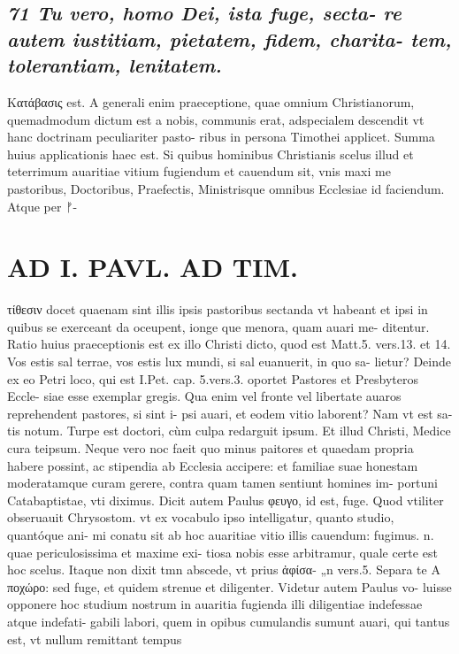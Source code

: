 \documentclass{article}
\begin{document}
\begin{pages}
\subsection*{\textit{71 Tu vero, homo Dei, ista fuge, secta- re autem iustitiam, pietatem, fidem, charita- tem, tolerantiam, lenitatem. }}\pstart Κατάβασις est. A generali enim praeceptione, quae omnium Christianorum, quemadmodum dictum est a nobis, communis erat, adspecialem descendit vt hanc doctrinam peculiariter pasto- ribus in persona Timothei applicet. Summa huius applicationis haec est. Si quibus hominibus Christianis scelus illud et teterrimum auaritiae vitium fugiendum et cauendum sit, vnis maxi me pastoribus, Doctoribus, Praefectis, Ministrisque omnibus Ecclesiae id faciendum. Atque per ᚠ-  \pend
\section*{AD I. PAVL. AD TIM. }
\marginpar{[ p.50. ]}\pstart τίθεσιν docet quaenam sint illis ipsis pastoribus sectanda vt habeant et ipsi in quibus se exerceant da oceupent, ionge que menora, quam auari me- ditentur.  \pend\pstart Ratio huius praeceptionis est ex illo Christi dicto, quod est Matt.5. vers.13. et 14. Vos estis sal terrae, vos estis lux mundi, si sal euanuerit, in quo sa- lietur? Deinde ex eo Petri loco, qui est I.Pet. cap. 5.vers.3. oportet Pastores et Presbyteros Eccle- siae esse exemplar gregis. Qua enim vel fronte vel libertate auaros reprehendent pastores, si sint i- psi auari, et eodem vitio laborent? Nam vt est sa- tis notum.  \pend\pstart Turpe est doctori, cùm culpa redarguit ipsum. Et illud Christi, Medice cura teipsum. Neque  vero noc faeit quo minus paitores et quaedam propria habere possint, ac stipendia ab Ecclesia accipere: et familiae suae honestam moderatamque curam gerere, contra quam tamen sentiunt homines im- portuni Catabaptistae, vti diximus.  \pend\pstart Dicit autem Paulus φευγο, id est, fuge. Quod vtiliter obseruauit Chrysostom. vt ex vocabulo ipso intelligatur, quanto studio, quantóque ani- mi conatu sit ab hoc auaritiae vitio illis cauendum: fugimus. n. quae periculosissima et maxime exi- tiosa nobis esse arbitramur, quale certe est hoc scelus. Itaque  non dixit tmn abscede, vt prius ἀφίσα- „n vers.5. Separa te Α ποχώρο: sed fuge, et quidem strenue et diligenter. Videtur autem Paulus vo- luisse opponere hoc studium nostrum in auaritia fugienda illi diligentiae indefessae atque indefati- gabili labori, quem in opibus cumulandis sumunt auari, qui tantus est, vt nullum remittant tempus  \pend

\end{pages}
\end{document}

